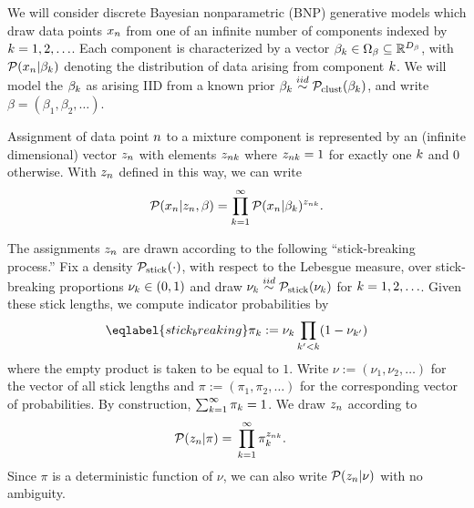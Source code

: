 We will consider discrete Bayesian nonparametric (BNP) generative models which
draw data points $x_n$ from one of an infinite number of components indexed by
$k = 1, 2, \ldots$.
Each component is characterized by a vector $\beta_k \in \Omega_{\beta} \subseteq
\mathbb{R}^{{D_{\beta}}}$, with $\mathcal{P}(x_n \vert \beta_k)$ denoting the
distribution of data arising from  component $k$. We will model the $\beta_k$
as arising IID from a known prior $\beta_k \overset{iid}{\sim} \mathcal{P}_{\mathrm{clust}}(\beta_k)$, and write
$\beta = (\beta_1, \beta_2, \ldots)$.

Assignment of data point $n$ to a mixture component is represented by an
(infinite dimensional) vector $z_n$ with elements $z_{nk}$
where $z_{nk} = 1$ for exactly one $k$ and $0$ otherwise.
With $z_n$ defined in this way, we can write
%
\begin{align*}
%
\p(\x_n \vert \z_\n, \beta) =
    \prod_{k=1}^\infty \p(\x_n \vert \beta_\k)^{\z_{\n\k}}.
%
\end{align*}


The assignments $z_{n}$ are drawn according to the following
``stick-breaking process.''  Fix a density $\mathcal{P}_{\mathrm{stick}}(\cdot)$, with respect to the
Lebesgue measure, over stick-breaking proportions $\nu_{k} \in (0, 1)$ and
draw $\nu_{k}\overset{iid}{\sim}\mathcal{P}_{\mathrm{stick}}(\nu_{k})$ for $k=1,2,\ldots$.
Given these stick lengths, we compute indicator probabilities by
%
\begin{align}\eqlabel{stick_breaking}
%
\pi_\k := \nuk \prod_{\k' < \k} (1 - \nu_{\k'})
%
\end{align}
%
where the empty product is taken to be equal to $1$.
Write $\nu := (\nu_1, \nu_2, \ldots)$ for the vector of all stick lengths
and $\pi := (\pi_1, \pi_2, \ldots)$ for the corresponding vector of
probabilities. By construction, $\sum_{k=1}^{\infty} \pi_k = 1$.
 We draw $z_n$ according to
%
\begin{align*}
%
\p(\z_\n \vert \pi) ={}&
    \prod_{k=1}^{\infty} \pi_\k^{\z_{\n\k}}.
%
\end{align*}
%
Since $\pi$ is a deterministic function of $\nu$, we can also write
$\mathcal{P}(z_n \vert \nu)$ with no ambiguity.

